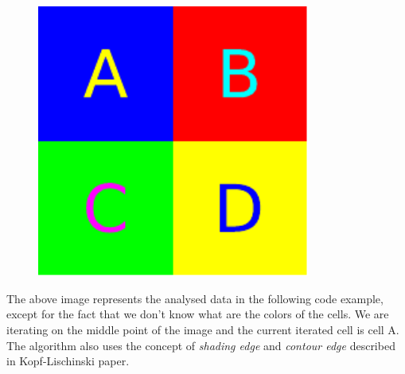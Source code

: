 \begin{figure}[H]
  \centering
  \includegraphics[width=0.8\textwidth]{assets/layout.pdf}
\end{figure}

The above image represents the analysed data in the following code example,
except for the fact that we don't know what are the colors of the cells. We are
iterating on the middle point of the image and the current iterated cell is cell
A. The algorithm also uses the concept of \emph{shading edge} and \emph{contour
edge} described in Kopf-Lischinski paper.


